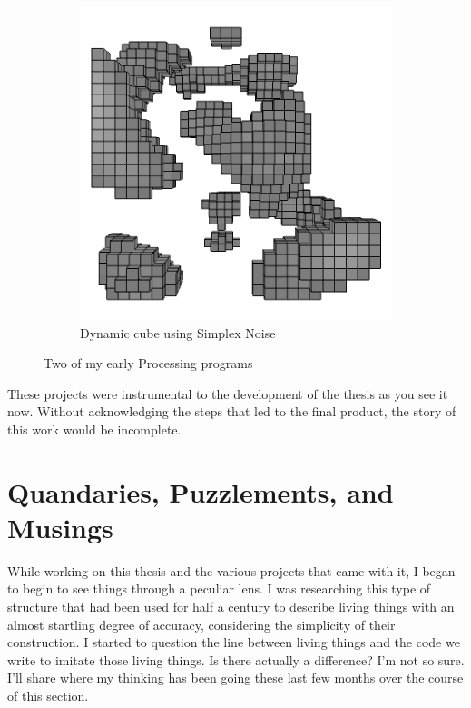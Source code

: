 \documentclass[12pt,twoside]{reedthesis}
\begin{document}
\begin{figure}[H]
\begin{subfigure}{0.48\linewidth}
		\includegraphics[width=\linewidth]{Images/SimplexImage}
		\caption{Dynamic cube using Simplex Noise}
		\label{Simplex}
	\end{subfigure}
	\caption{Two of my early Processing programs}
	\label{EarlyProcessing}
	\end{figure}
	
	These projects were instrumental to the development of the thesis as you see it now. Without acknowledging the steps that led to the final product, the story of this work would be incomplete.

\section{Quandaries, Puzzlements, and Musings}
\label{Questions}

	While working on this thesis and the various projects that came with it, I began to begin to see things through a peculiar lens. I was researching this type of structure that had been used for half a century to describe living things with an almost startling degree of accuracy, considering the simplicity of their construction. I started to question the line between living things and the code we write to imitate those living things. Is there actually a difference? I'm not so sure. I'll share where my thinking has been going these last few months over the course of this section.
	
\end{document}

